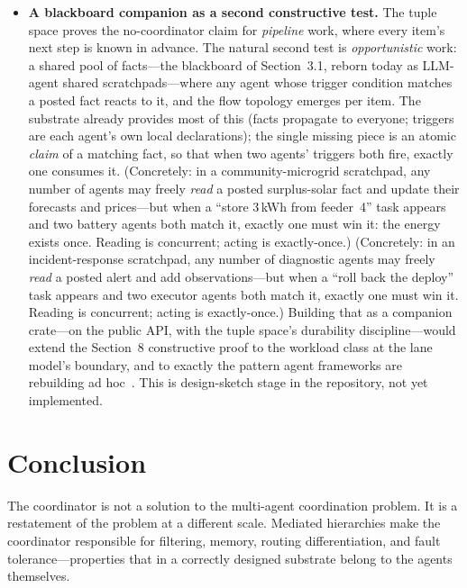 \documentclass[11pt]{article}
\begin{document}
\begin{itemize}
\item \textbf{A blackboard companion as a second constructive test.} The
  tuple space proves the no-coordinator claim for \emph{pipeline} work, where
  every item's next step is known in advance. The natural second test is
  \emph{opportunistic} work: a shared pool of facts---the blackboard of
  Section~3.1, reborn today as LLM-agent shared scratchpads---where any agent
  whose trigger condition matches a posted fact reacts to it, and the flow
  topology emerges per item. The substrate already provides most of this
  (facts propagate to everyone; triggers are each agent's own local
  declarations); the single missing piece is an atomic \emph{claim} of a
  matching fact, so that when two agents' triggers both fire, exactly one
  consumes it. (Concretely: in a community-microgrid scratchpad, any number of
  agents may freely \emph{read} a posted surplus-solar fact and update their
  forecasts and prices---but when a ``store 3\,kWh from feeder~4'' task
  appears and two battery agents both match it, exactly one must win it: the
  energy exists once. Reading is concurrent; acting is exactly-once.) (Concretely: in an incident-response scratchpad, any number of
  diagnostic agents may freely \emph{read} a posted alert and add
  observations---but when a ``roll back the deploy'' task appears and two
  executor agents both match it, exactly one must win it. Reading is
  concurrent; acting is exactly-once.) Building that as a companion crate---on the public API, with
  the tuple space's durability discipline---would extend the Section~8
  constructive proof to the workload class at the lane model's boundary, and
  to exactly the pattern agent frameworks are rebuilding ad
  hoc~\cite{carvalho}. This is design-sketch stage in the repository, not yet
  implemented.
\end{itemize}

\section{Conclusion}

The coordinator is not a solution to the multi-agent coordination problem. It is a
restatement of the problem at a different scale. Mediated hierarchies make the
coordinator responsible for filtering, memory, routing differentiation, and fault
tolerance---properties that in a correctly designed substrate belong to the agents
themselves.
\end{document}
